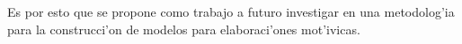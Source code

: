 Es por esto que se propone como trabajo a futuro investigar en una metodolog'ia para la construcci'on de modelos para elaboraci'ones mot'ivicas.

\begin{imagen}
    \width{5cm}
\end{imagen}

%
%
%
%
